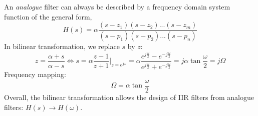 An \textit{analogue} filter can always be described by a frequency domain system function of the general form, 
\[
    H(s) = \alpha\frac{(s-z_{1})(s-z_{2})...(s-z_{m})}{(s-p_{1})(s-p_{2})...(s-p_{n})}
\]
In bilinear transformation, we replace $s$ by $z$:
\[
    z = \frac{\alpha+s}{\alpha-s} \Leftrightarrow s 
    = \alpha \frac{z-1}{z+1} \bigg \lvert_{z=e^{j\omega}} 
    = \alpha \frac{e^{j\frac{\omega}{2}} - e^{-j\frac{\omega}{2}}}{e^{j\frac{\omega}{2}} + e^{-j\frac{\omega}{2}}} 
    = j\alpha\tan\frac{\omega}{2} = j\Omega
\]
Frequency mapping:
\[
    \Omega = \alpha \tan\frac{\omega}{2}
\]
Overall, the bilinear transformation allows the design of IIR filters from analogue filters: $H(s) \to H(\omega)$.